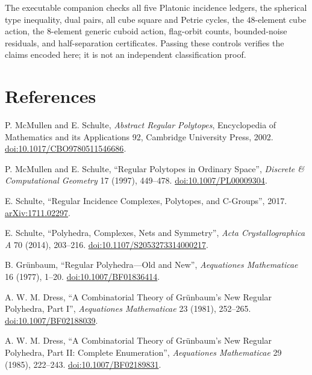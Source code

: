 \documentclass[11pt,a4paper]{article}
\theoremstyle{definition}
\theoremstyle{plain}
\theoremstyle{remark}
\begin{document}
The executable companion checks all five Platonic incidence ledgers,
the spherical type inequality, dual pairs, all cube square and Petrie
cycles, the \(48\)-element cube action, the \(8\)-element generic
cuboid action, flag-orbit counts, bounded-noise residuals, and
half-separation certificates.  Passing these controls verifies the
claims encoded here; it is not an independent classification proof.

\section*{References}

{\raggedright\small
\begin{enumerate}[label={[\arabic*]},leftmargin=2em,itemsep=2pt,topsep=3pt]
  \item P. McMullen and E. Schulte,
  \emph{Abstract Regular Polytopes}, Encyclopedia of Mathematics and
  its Applications 92, Cambridge University Press, 2002.
  \href{https://doi.org/10.1017/CBO9780511546686}
  {doi:10.1017/CBO9780511546686}.

  \item P. McMullen and E. Schulte, ``Regular Polytopes in Ordinary
  Space'', \emph{Discrete \& Computational Geometry} 17 (1997),
  449--478.
  \href{https://doi.org/10.1007/PL00009304}
  {doi:10.1007/PL00009304}.

  \item E. Schulte, ``Regular Incidence Complexes, Polytopes, and
  C-Groups'', 2017.
  \href{https://arxiv.org/abs/1711.02297}{arXiv:1711.02297}.

  \item E. Schulte, ``Polyhedra, Complexes, Nets and Symmetry'',
  \emph{Acta Crystallographica A} 70 (2014), 203--216.
  \href{https://doi.org/10.1107/S2053273314000217}
  {doi:10.1107/S2053273314000217}.

  \item B. Grünbaum, ``Regular Polyhedra---Old and New'',
  \emph{Aequationes Mathematicae} 16 (1977), 1--20.
  \href{https://doi.org/10.1007/BF01836414}
  {doi:10.1007/BF01836414}.

  \item A. W. M. Dress, ``A Combinatorial Theory of Grünbaum's New
  Regular Polyhedra, Part I'', \emph{Aequationes Mathematicae} 23
  (1981), 252--265.
  \href{https://doi.org/10.1007/BF02188039}
  {doi:10.1007/BF02188039}.

  \item A. W. M. Dress, ``A Combinatorial Theory of Grünbaum's New
  Regular Polyhedra, Part II: Complete Enumeration'',
  \emph{Aequationes Mathematicae} 29 (1985), 222--243.
  \href{https://doi.org/10.1007/BF02189831}
  {doi:10.1007/BF02189831}.
\end{enumerate}
}
\end{document}
